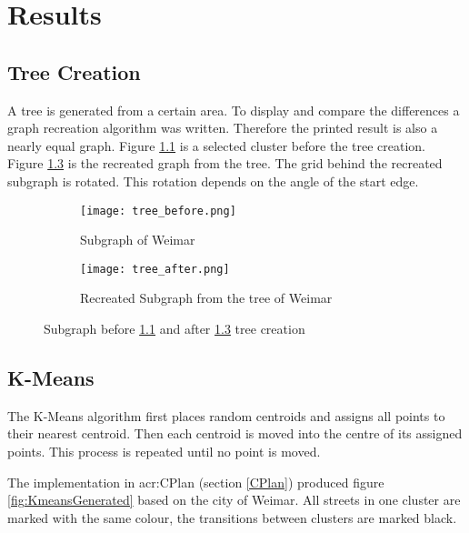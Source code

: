 \pagebreak
\chapter{Results}
\section{Tree Creation}
A tree is generated from a certain area. To display and compare the differences a graph recreation algorithm was written. Therefore the printed result is also a nearly equal graph. Figure \ref{fig:tree_example} is a selected cluster before the tree creation. Figure \ref{fig:tree_example_after} is the recreated graph from the tree. The grid behind the recreated subgraph is rotated. This rotation depends on the angle of the start edge.

\begin{figure}[hb]
    \centering
    \begin{subfigure}[b]{0.45\textwidth}
        \begin{mdframed}[style=mdthight]
            \texttt{[image: tree\_before.png]}
        \end{mdframed}
        \caption{Subgraph of Weimar}
        \label{fig:tree_example}
    \end{subfigure}
    \par
    \begin{subfigure}[b]{0.45\textwidth}
        \begin{mdframed}[style=mdthight]
            \texttt{[image: tree\_after.png]}
        \end{mdframed}
        \caption{Recreated Subgraph from the tree of Weimar}
        \label{fig:tree_example_after}
    \end{subfigure}
    \caption{Subgraph before \ref{fig:tree_example} and after \ref{fig:tree_example_after} tree creation}
\end{figure}

\FloatBarrier
\section{K-Means}
The K-Means algorithm first places random centroids and assigns all points to their nearest centroid. Then each centroid is moved into the centre of its assigned points. This process is repeated until no point is moved.

The implementation in \acrshort{acr:CPlan} (section \ref{CPlan}) produced figure \ref{fig:KmeansGenerated} based on the city of Weimar. All streets in one cluster are marked with the same colour, the transitions between clusters are marked black.

